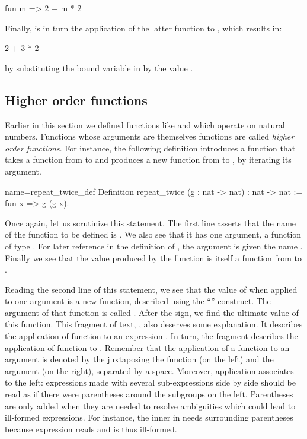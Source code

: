 \begin{coq}{}{}
fun m => 2 + m * 2
\end{coq}
Finally,  is in turn the application of the latter function to
, which results in:

\begin{coq}{}{}
2 + 3 * 2
\end{coq}
by substituting the bound variable  in  by
the value .




\subsection{Higher order functions}

Earlier in this section we defined functions like  and 
which operate on natural numbers. Functions whose arguments are
themselves functions are called \emph{higher order functions}.
For instance, the following definition introduces a function that
takes a function from  to  and produces a new function
from  to , by iterating its argument.

\begin{coq}{name=repeat_twice_def}{}
Definition repeat_twice (g : nat -> nat) : nat -> nat :=
  fun x => g (g x).
\end{coq}
Once again, let us scrutinize this \Coq{} statement. The first line
asserts that the name of the function to be defined is .
We also see that it has one argument, a function of
type .  For later reference in the definition of
, the argument is given the name .  Finally
we see that the value produced by the function 
is itself a function from  to .

Reading the second line of this statement, we see that the value
of  when applied to one argument is a new
function, described using the ``'' construct.  The
argument of that function is called .  After the \C{=>} sign, we
find the ultimate value of this function.  This fragment of text, , also deserves some explanation. It describes the
application of function  to an expression .  In turn,
the fragment  describes the application of function  to
. Remember that the  application of a function to an
argument is denoted by the juxtaposing the function (on the left) and
the argument (on the right), separated by a space. Moreover,
application associates to the left: expressions made with
several sub-expressions side by side should be read as if there were
parentheses around the subgroups on the left. Parentheses are
only added when they are needed to resolve ambiguities which could
lead to ill-formed expressions.  For instance, the inner  in
 needs surrounding parentheses because expression
 reads  and is thus ill-formed.

